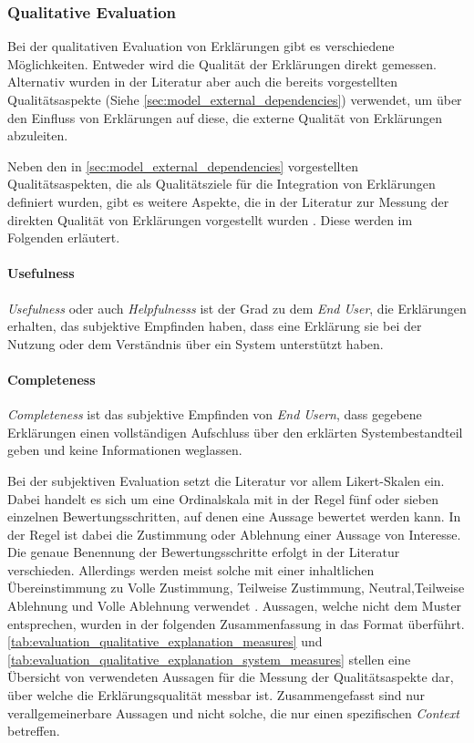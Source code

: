 \subsubsection{Qualitative Evaluation}

Bei der qualitativen Evaluation von Erklärungen gibt es verschiedene Möglichkeiten. Entweder wird die Qualität der Erklärungen direkt gemessen. Alternativ wurden in der Literatur aber auch die bereits vorgestellten Qualitätsaspekte (Siehe \autoref{sec:model_external_dependencies}) verwendet, um über den Einfluss von Erklärungen auf diese, die externe Qualität von Erklärungen abzuleiten.

Neben den in \autoref{sec:model_external_dependencies} vorgestellten Qualitätsaspekten, die als Qualitätsziele für die Integration von Erklärungen definiert wurden, gibt es weitere Aspekte, die in der Literatur zur Messung der direkten Qualität von Erklärungen vorgestellt wurden \cite{sato_action-triggering_2019}. Diese werden im Folgenden erläutert.

\paragraph{Usefulness} \textit{Usefulness} oder auch \textit{Helpfulnesss} ist der Grad zu dem \textit{End User}, die Erklärungen erhalten, das subjektive Empfinden haben, dass eine Erklärung sie bei der Nutzung oder dem Verständnis über ein System unterstützt haben. 

\paragraph{Completeness} \textit{Completeness} ist das subjektive Empfinden von \textit{End Usern}, dass gegebene Erklärungen einen vollständigen Aufschluss über den erklärten Systembestandteil geben und keine Informationen weglassen.

\bigskip

Bei der subjektiven Evaluation setzt die Literatur vor allem Likert-Skalen ein. Dabei handelt es sich um eine Ordinalskala mit in der Regel fünf oder sieben einzelnen Bewertungsschritten, auf denen eine Aussage bewertet werden kann. In der Regel ist dabei die Zustimmung oder Ablehnung einer Aussage von Interesse. Die genaue Benennung der Bewertungsschritte erfolgt in der Literatur verschieden. Allerdings werden meist solche mit einer inhaltlichen Übereinstimmung zu \glqq Volle Zustimmung\grqq{}, \glqq Teilweise Zustimmung\grqq{}, \glqq Neutral\grqq{},\glqq Teilweise Ablehnung\grqq{} und \glqq Volle Ablehnung\grqq{} verwendet \cite{sato_action-triggering_2019, sato_context_nodate, wang_is_2018, hoffman_metrics_nodate, koo_understanding_2016, koo_why_2015, hernandez-bocanegra_effects_2020}. Aussagen, welche nicht dem Muster entsprechen, wurden in der folgenden Zusammenfassung in das Format überführt. \autoref{tab:evaluation_qualitative_explanation_measures} und \autoref{tab:evaluation_qualitative_explanation_system_measures} stellen eine Übersicht von verwendeten Aussagen für die Messung der Qualitätsaspekte dar, über welche die Erklärungsqualität messbar ist. Zusammengefasst sind nur verallgemeinerbare Aussagen und nicht solche, die nur einen spezifischen \textit{Context} betreffen.

